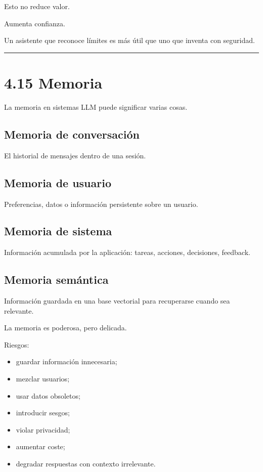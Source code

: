Esto no reduce valor.

Aumenta confianza.

Un asistente que reconoce límites es más útil que uno que inventa con
seguridad.

\begin{center}\rule{0.5\linewidth}{0.5pt}\end{center}

\section{4.15 Memoria}\label{memoria}

La memoria en sistemas LLM puede significar varias cosas.

\subsection{Memoria de conversación}\label{memoria-de-conversaciuxf3n}

El historial de mensajes dentro de una sesión.

\subsection{Memoria de usuario}\label{memoria-de-usuario}

Preferencias, datos o información persistente sobre un usuario.

\subsection{Memoria de sistema}\label{memoria-de-sistema}

Información acumulada por la aplicación: tareas, acciones, decisiones,
feedback.

\subsection{Memoria semántica}\label{memoria-semuxe1ntica}

Información guardada en una base vectorial para recuperarse cuando sea
relevante.

La memoria es poderosa, pero delicada.

Riesgos:

\begin{itemize}
\tightlist
\item
  guardar información innecesaria;
\item
  mezclar usuarios;
\item
  usar datos obsoletos;
\item
  introducir sesgos;
\item
  violar privacidad;
\item
  aumentar coste;
\item
  degradar respuestas con contexto irrelevante.
\end{itemize}


